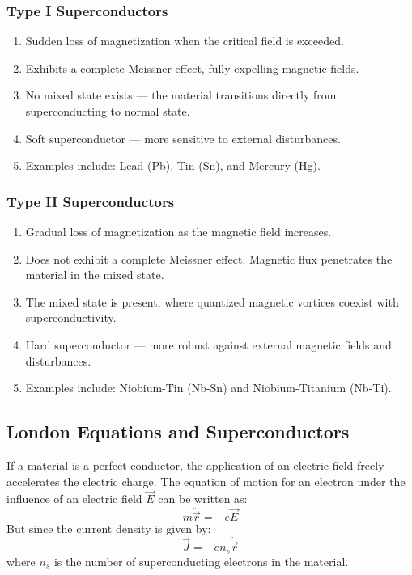 \documentclass{article}
\begin{document}
\subsubsection{Type I Superconductors}
\begin{enumerate}
    \item Sudden loss of magnetization when the critical field is exceeded.
    \item Exhibits a complete Meissner effect, fully expelling magnetic fields.
    \item No mixed state exists — the material transitions directly from superconducting to normal state.
    \item Soft superconductor — more sensitive to external disturbances.
    \item Examples include: Lead (Pb), Tin (Sn), and Mercury (Hg).
\end{enumerate}

\subsubsection{Type II Superconductors}
\begin{enumerate}
    \item Gradual loss of magnetization as the magnetic field increases.
    \item Does not exhibit a complete Meissner effect. Magnetic flux penetrates the material in the mixed state.
    \item The mixed state is present, where quantized magnetic vortices coexist with superconductivity.
    \item Hard superconductor — more robust against external magnetic fields and disturbances.
    \item Examples include: Niobium-Tin (Nb-Sn) and Niobium-Titanium (Nb-Ti).
\end{enumerate}

\subsection{London Equations and Superconductors}

If a material is a perfect conductor, the application of an electric field freely accelerates the electric charge. The equation of motion for an electron under the influence of an electric field \(\vec{E}\) can be written as:
\[
m \ddot{\vec{r}} = -e \vec{E} \tag{1}
\]
But since the current density is given by:
\[
\vec{J} = -en_s \dot{\vec{r}} \tag{2a}
\]
where \(n_s\) is the number of superconducting electrons in the material.
\end{document}
